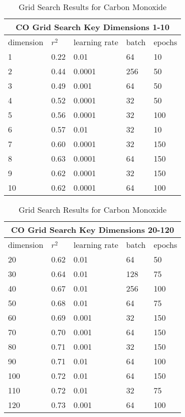 \documentclass{article}
\begin{document}
\begin{table}[h!]
\begin{center}
    \caption{Grid Search Results for Carbon Monoxide}
    \label{tab:table2}
    \vspace{0.1cm}
    \begin{tabular}{p{2cm}p{2cm}p{2cm}p{2cm}p{2cm}}
        \hline
        \multicolumn{5}{c}{CO Grid Search Key Dimensions 1-10}\\
        \hline
        dimension & $r^{2}$ & learning rate & batch & epochs  \\
        1 & 0.22 & 0.01 & 64 & 10 \\
        2 & 0.44 & 0.0001 & 256 & 50\\
        3 & 0.49 & 0.001 & 64 & 50\\
        4 & 0.52 & 0.0001 & 32 & 50\\
        5 & 0.56 & 0.0001 & 32 & 100\\
        6 & 0.57 & 0.01 & 32 & 10\\
        7 & 0.60 & 0.0001 & 32 & 150\\
        8 & 0.63 & 0.0001 & 64 & 150\\
        9 & 0.62 & 0.0001 & 32 & 150\\
        10 & 0.62 & 0.0001 & 64 & 100\\
        \hline
    \end{tabular}
\end{center}
\end{table}
\begin{table}[h!]
\begin{center}
    \caption{Grid Search Results for Carbon Monoxide}
    \label{tab:table2}
    \vspace{0.1cm}
    \begin{tabular}{p{2cm}p{2cm}p{2cm}p{2cm}p{2cm}}
        \hline
        \multicolumn{5}{c}{CO Grid Search Key Dimensions 20-120}\\
        \hline
        dimension & $r^{2}$ & learning rate & batch & epochs  \\
        20 & 0.62 & 0.01 & 64 & 50\\
        30 & 0.64 & 0.01 & 128 & 75\\
        40 & 0.67 & 0.01 & 256 & 100\\
        50 & 0.68 & 0.01 & 64 & 75\\
        60 & 0.69 & 0.001 & 32 & 150\\
        70 & 0.70 & 0.001 & 64 & 150\\
        80 & 0.71 & 0.001 & 32 & 150\\
        90 & 0.71 & 0.01 & 64 & 100\\
        100 & 0.72 & 0.01 & 64 & 150\\
        110 & 0.72 & 0.01 & 32 & 75\\
        120 & 0.73 & 0.001 & 64 & 100\\
        \hline
    \end{tabular}
\end{center}
\end{table}
\newpage
\end{document}
